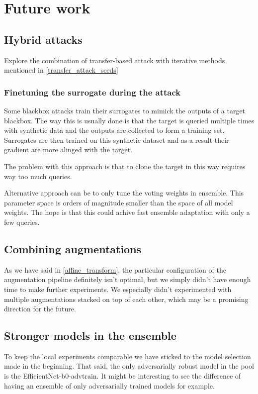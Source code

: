 \chapter{Future work}
\label{future_work}

\section{Hybrid attacks}
Explore the combination of transfer-based attack with iterative methods mentioned in \ref{transfer_attack_seeds}

\subsection{Finetuning the surrogate during the attack}
Some blackbox attacks train their surrogates to mimick the outputs of a target blackbox. The way this is usually done is that the target is queried multiple times with synthetic data and the outputs are collected to form a training set. Surrogates are then trained on this synthetic dataset and as a result their gradient are more alinged with the target. \cite{papernot2017practical}

The problem with this approach is that to clone the target in this way requires way too much queries.

Alternative approach can be to only tune the voting weights in ensemble. This parameter space is orders of magnitude smaller than the space of all model weights. The hope is that this could achive fast ensemble adaptation with only a few queries.

\section{Combining augmentations}
As we have said in \ref{affine_transform}, the particular configuration of the augmentation pipeline definitely isn't optimal, but we simply didn't have enough time to make further experiments. We especially didn't experimented with multiple augmentations stacked on top of each other, which may be a promising direction for the future.

\section{Stronger models in the ensemble}
To keep the local experiments comparable we have sticked to the model selection made in the beginning. That said, the only adversarially robust model in the pool is the EfficientNet-b0-advtrain. It might be interesting to see the difference of having an ensemble of only adversarially trained models for example.

